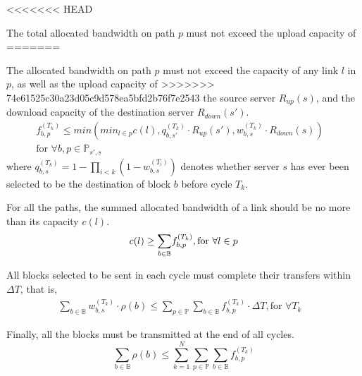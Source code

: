 \begin{packeditemize}
<<<<<<< HEAD
\item The total allocated bandwidth on path $p$ must not exceed the
upload capacity of
=======
\item The allocated bandwidth on path $p$ must not exceed the
capacity of any link $l$ in $p$, as well as the upload capacity of
>>>>>>> 74e61525c30a23d05c9d578ea5bfd2b76f7e2543
the source server $R_{up}(s)$, and the download capacity of the
destination server $R_{down}(s')$.
\begin{equation}
\begin{split}
f^{(T_k)}_{b,p} \leq min\left(min_{l\in p} c(l),
q_{b,s'}^{(T_k)}\cdot R_{up}(s'),
w_{b,s}^{(T_k)}\cdot R_{down}(s)\right) &\\
\text{for }\forall b, p\in \mathbb{P}_{s',s} &
\end{split}
\end{equation}
where $q_{b,s}^{(T_k)} = 1-\prod_{i<k} (1-w_{b,s}^{(T_i)})$ denotes
whether server $s$ has ever been selected to be the destination of
block $b$ before cycle $T_k$.

\item For all the paths, the summed allocated bandwidth of a link
should be no more than its capacity $c(l)$.
\begin{equation}
c(l) \geq \displaystyle{\sum_{b \in \mathbb{B}}}
f^{(T_k)}_{b,p},
\text{for }\forall l\in p\\
\end{equation}

\item All blocks selected to be sent in each cycle must complete
their transfers within $\Delta T$, that is,
\begin{equation}
\begin{split}
\displaystyle{\sum_{b \in \mathbb{B}}} w_{b,s}^{(T_k)} \cdot \rho(b)
\leq \displaystyle{\sum_{p\in \mathbb{P}}}
\displaystyle{\sum_{b \in \mathbb{B}}} f^{(T_k)}_{b,p} \cdot
\Delta T,
\text{for }\forall T_k &
\end{split}
\end{equation}


\item Finally, all the blocks must be transmitted at the end of all
cycles.
\begin{equation}
\displaystyle{\sum_{b\in \mathbb{B}}} \rho(b) \leq
\displaystyle{\sum_{k=1}^{N}}
\displaystyle{\sum_{p\in \mathbb{P}}}
\displaystyle{\sum_{b\in \mathbb{B}}}
f_{b,p}^{(T_k)}
\end{equation}
\end{packeditemize}


